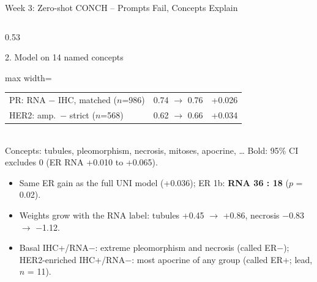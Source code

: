 \documentclass[aspectratio=169,10pt]{beamer}
\begin{document}
\begin{frame}[t]{Week 3: Zero-shot CONCH -- Prompts Fail, Concepts Explain}
\begin{columns}[T]
\begin{column}{0.53\textwidth}
\begin{block}{2. Model on 14 named concepts}
\begin{adjustbox}{max width=\linewidth}
\begin{tabular}{lcc}
PR: RNA $-$ IHC, matched ($n$=986) & 0.74 $\rightarrow$ 0.76 & +0.026 \\
HER2: amp.\ $-$ strict ($n$=568) & 0.62 $\rightarrow$ 0.66 & +0.034 \\
\bottomrule
\end{tabular}
\end{adjustbox}\\[1pt]
{\tiny Concepts: tubules, pleomorphism, necrosis, mitoses, apocrine, \ldots{} Bold: 95\% CI excludes 0
(ER RNA +0.010 to +0.065).}
\end{block}
\begin{itemize}
  \item Same ER gain as the full UNI model (+0.036); ER 1b: \textbf{RNA 36 : 18} ($p$ = 0.02).
  \item Weights grow with the RNA label: tubules +0.45 $\rightarrow$ +0.86, necrosis $-$0.83 $\rightarrow$ $-$1.12.
  \item Basal IHC+/RNA$-$: extreme pleomorphism and necrosis (called ER$-$); HER2-enriched IHC+/RNA$-$: most apocrine
        of any group (called ER+; lead, $n$ = 11).
\end{itemize}
\end{column}
\end{columns}
\end{frame}
\end{document}
